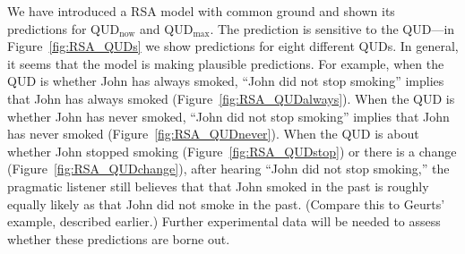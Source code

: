 We have introduced a RSA model with common ground and shown its
 predictions for QUD$_\textrm{now}$ and QUD$_\textrm{max}$.
The prediction is sensitive to the QUD---in Figure~\ref{fig:RSA_QUDs} we show predictions for eight different QUDs.
In general, it seems that the model is making plausible predictions. 
For example, when the QUD is whether John has always smoked, ``John did not stop smoking'' implies that John has always smoked (Figure~\ref{fig:RSA_QUDalways}). 
When the QUD is whether John has never smoked, ``John did not stop smoking'' implies that John has never smoked (Figure~\ref{fig:RSA_QUDnever}). 
When the QUD is about whether John stopped smoking (Figure~\ref{fig:RSA_QUDstop}) 
 or there is a change (Figure~\ref{fig:RSA_QUDchange}), after hearing
 ``John did not stop smoking,'' the pragmatic listener still believes that that John 
 smoked in the past is roughly equally likely as that John did not smoke in the past. 
 (Compare this to Geurts' example, described earlier.)
Further experimental data will be needed to assess whether these predictions are borne out.

